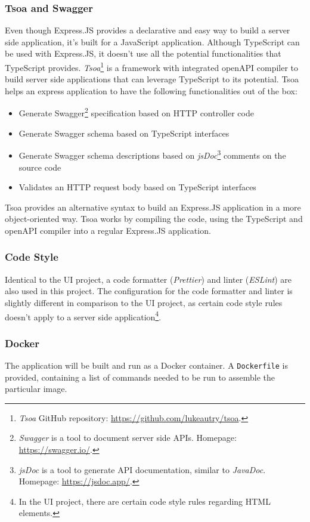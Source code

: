  \subsubsection{Tsoa and Swagger}
  Even though Express.JS provides a declarative and easy way to build a server side application, it's built for a JavaScript application. Although TypeScript can be used with Express.JS, it doesn't use all the potential functionalities that TypeScript provides. \emph{Tsoa}\footnote{\emph{Tsoa} GitHub repository: \url{https://github.com/lukeautry/tsoa}.} is a framework with integrated openAPI compiler to build server side applications that can leverage TypeScript to its potential. Tsoa helps an express application to have the following functionalities out of the box:

   \begin{itemize}
    \item Generate Swagger\footnote{\emph{Swagger} is a tool to document server side APIs. Homepage: \url{https://swagger.io/}.} specification based on HTTP controller code
    \item Generate Swagger schema based on TypeScript interfaces
    \item Generate Swagger schema descriptions based on \emph{jsDoc}\footnote{\emph{jsDoc} is a tool to generate API documentation, similar to \emph{JavaDoc}. Homepage: \url{https://jsdoc.app/}.} comments on the source code
    \item Validates an HTTP request body based on TypeScript interfaces
   \end{itemize}
  
  Tsoa provides an alternative syntax to build an Express.JS application in a more object-oriented way. Tsoa works by compiling the code, using the TypeScript and openAPI compiler into a regular Express.JS application. 

  \subsubsection{Code Style}
  Identical to the UI project, a code formatter (\emph{Prettier}) and linter (\emph{ESLint}) are also used in this project. The configuration for the code formatter and linter is slightly different in comparison to the UI project, as certain code style rules doesn't apply to a server side application\footnote{In the UI project, there are certain code style rules regarding HTML elements.}.

  \subsubsection{Docker}
  The application will be built and run as a Docker container. A \verb;Dockerfile; is provided, containing a list of commands needed to be run to assemble the particular image.

